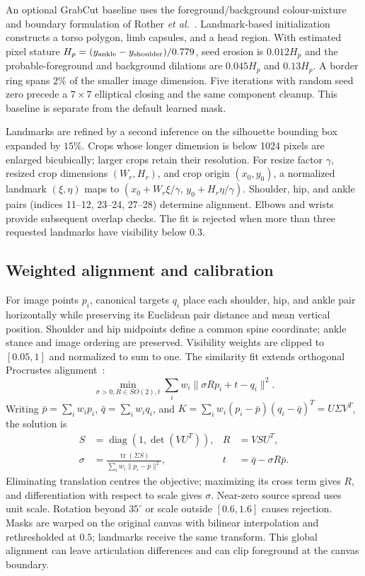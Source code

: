 \documentclass[11pt,a4paper]{article}
\begin{document}
An optional GrabCut baseline uses the foreground/background colour-mixture and boundary formulation of Rother \emph{et al.}~\cite{rother2004grabcut}. Landmark-based initialization constructs a torso polygon, limb capsules, and a head region. With estimated pixel stature $H_p=(y_{\rm ankle}-y_{\rm shoulder})/0.779$, seed erosion is $0.012H_p$ and the probable-foreground and background dilations are $0.045H_p$ and $0.13H_p$. A border ring spans $2\%$ of the smaller image dimension. Five iterations with random seed zero precede a $7\times7$ elliptical closing and the same component cleanup. This baseline is separate from the default learned mask.

Landmarks are refined by a second inference on the silhouette bounding box expanded by $15\%$. Crops whose longer dimension is below 1024 pixels are enlarged bicubically; larger crops retain their resolution. For resize factor $\gamma$, resized crop dimensions $(W_r,H_r)$, and crop origin $(x_0,y_0)$, a normalized landmark $(\xi,\eta)$ maps to $(x_0+W_r\xi/\gamma,\,y_0+H_r\eta/\gamma)$. Shoulder, hip, and ankle pairs (indices 11--12, 23--24, 27--28) determine alignment. Elbows and wrists provide subsequent overlap checks. The fit is rejected when more than three requested landmarks have visibility below $0.3$.

\subsection{Weighted alignment and calibration}
For image points $p_i$, canonical targets $q_i$ place each shoulder, hip, and ankle pair horizontally while preserving its Euclidean pair distance and mean vertical position. Shoulder and hip midpoints define a common spine coordinate; ankle stance and image ordering are preserved. Visibility weights are clipped to $[0.05,1]$ and normalized to sum to one. The similarity fit extends orthogonal Procrustes alignment~\cite{schonemann1966generalized}:
\begin{equation}
 \min_{\sigma>0,R\in SO(2),t}\sum_iw_i\|\sigma Rp_i+t-q_i\|^2.
 \label{eq:procrustes}
\end{equation}
Writing $\bar p=\sum_iw_ip_i$, $\bar q=\sum_iw_iq_i$, and
$K=\sum_iw_i(p_i-\bar p)(q_i-\bar q)^T=U\Sigma V^T$, the solution is
\begin{equation}
 \begin{aligned}
 S&=\operatorname{diag}(1,\det(VU^T)),& R&=VSU^T,\\
 \sigma&=\frac{\operatorname{tr}(\Sigma S)}{\sum_iw_i\|p_i-\bar p\|^2},&
 t&=\bar q-\sigma R\bar p.
 \end{aligned}
\end{equation}
Eliminating translation centres the objective; maximizing its cross term gives $R$, and differentiation with respect to scale gives $\sigma$. Near-zero source spread uses unit scale. Rotation beyond $35^\circ$ or scale outside $[0.6,1.6]$ causes rejection. Masks are warped on the original canvas with bilinear interpolation and rethresholded at $0.5$; landmarks receive the same transform. This global alignment can leave articulation differences and can clip foreground at the canvas boundary.
\end{document}

